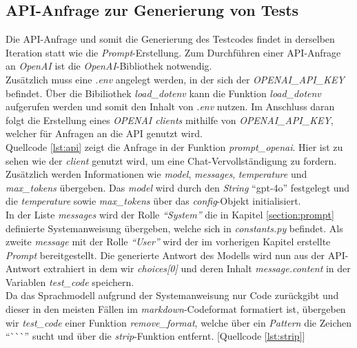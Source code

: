 \subsection{API-Anfrage zur Generierung von Tests}
Die API-Anfrage und somit die Generierung des Testcodes findet in derselben Iteration statt wie die \textit{Prompt}-Erstellung. Zum Durchführen einer API-Anfrage an \textit{OpenAI} ist die \textit{OpenAI}-Bibliothek notwendig.\\ Zusätzlich muss eine \textit{.env} angelegt werden, in der sich der \textit{OPENAI\_API\_KEY} befindet. Über die Bibiliothek \textit{load\_dotenv} kann die Funktion \textit{load\_dotenv} aufgerufen werden und somit den Inhalt von \textit{.env} nutzen. Im Anschluss daran folgt die Erstellung eines \textit{OPENAI clients} mithilfe von \textit{OPENAI\_API\_KEY}, welcher für Anfragen an die API genutzt wird. \\Quellcode \ref{lst:api} zeigt die Anfrage in der Funktion \textit{prompt\_openai}. Hier ist zu sehen wie der \textit{client} genutzt wird, um eine Chat-Vervollständigung zu fordern. \\
\vspace{-.3cm}
Zusätzlich werden Informationen wie \textit{model}, \textit{messages}, \textit{temperature} und \textit{max\_tokens} übergeben. Das \textit{model} wird durch den \textit{String} ``gpt-4o'' festgelegt und die \textit{temperature} sowie \textit{max\_tokens} über das \textit{config}-Objekt initialisiert.\\ In der Liste \textit{messages} wird der Rolle \textit{``System''} die in Kapitel \ref{section:prompt} definierte Systemanweisung übergeben, welche sich in \textit{constants.py} befindet. Als zweite \textit{message} mit der Rolle \textit{``User''} wird der im vorherigen Kapitel erstellte \textit{Prompt} bereitgestellt. Die generierte Antwort des Modells wird nun aus der API-Antwort extrahiert in dem wir \textit{choices[0]} und deren Inhalt \textit{message.content} in der Variablen \textit{test\_code} speichern.\\ Da das Sprachmodell aufgrund der 
Systemanweisung nur Code zurückgibt und dieser in den meisten Fällen im \textit{markdown}-Codeformat formatiert ist, übergeben wir \textit{test\_code} einer Funktion \textit{remove\_format}, welche über ein \textit{Pattern} die Zeichen ``\`{}\`{}\`{}'' sucht und über die \textit{strip}-Funktion entfernt. [Quellcode \ref{lst:strip}]\\
\vspace{-.3cm}

